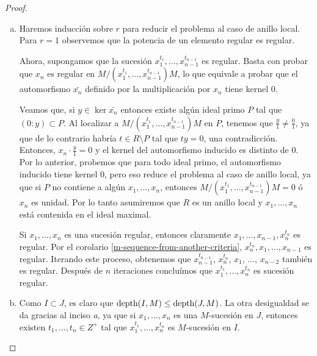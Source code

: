 \begin{proof}
\begin{enumerate}[a.]
\item Haremos inducción sobre $r$ para reducir el problema al caso de anillo local. Para $r = 1$ observemos que la potencia de un elemento regular es regular.

Ahora, supongamos que la sucesión $x_1^{t_1},\dots,x_{n-1}^{t_{n-1}}$ es regular. Basta con probar que $x_n$ es regular en $M/(x_1^{t_1},\dots,x_{n-1}^{t_{n-1}})M$, lo que equivale a probar que el automorfismo $\bar{x_n}$ definido por la multiplicación por $x_n$ tiene kernel 0. 

Veamos que, si $y \in \ker \bar{x_n}$ entonces existe algún ideal primo $P$ tal que $(0:y) \subset P$. Al localizar a $M/(x_1^{t_1},\dots,x_{n-1}^{t_{n-1}})M$ en $P$, tenemos que $\frac{y}{1} \neq \frac{0}{1}$, ya que de lo contrario habría $t \in R\setminus P$ tal que $ty = 0$, una contradicción. Entonces, $x_n\cdot\frac{y}{1} = 0$ y el kernel del automorfismo inducido es distinto de 0. Por lo anterior, probemos que para todo ideal primo, el automorfismo inducido tiene kernel 0, pero eso reduce el problema al caso de anillo local, ya que si $P$ no contiene a algún $x_1,\dots,x_n$, entonces $M/(x_1^{t_1},\dots,x_{n-1}^{t_{n-1}})M = 0$ ó $x_n$ es unidad. Por lo tanto asumiremos que $R$ es un anillo local y $x_1,\dots,x_n$ está contenida en el ideal maximal.

Si $x_1,\dots,x_n$ es una sucesión regular, entonces claramente $x_1,\dots,x_{n-1},x_n^{t_n}$ es regular. Por el corolario \ref{m-sequence-from-another-criteria}, $x_n^{t_n},x_1,\dots,x_{n-1}$ es regular. Iterando este proceso, obtenemos que $x_{n-1}^{t_{n-1}}$, $x_n^{t_n}$, $x_1$, $\dots$, $x_{n-2}$ también es regular. Después de $n$ iteraciones concluímos que $x_1^{t_1},\dots,x_n^{t_n}$ es sucesión regular.

\item Como $I \subset J$, es claro que $\textrm{depth}(I,M) \leq \textrm{depth}(J,M)$. La otra desigualdad se da gracias al inciso \emph{a}, ya que si $x_1, \dots, x_n$ es una $M$-sucesión en $J$, entonces existen $t_1,\dots,t_n \in Z^+$ tal que $x_1^{t_1},\dots,x_n^{t_n}$ es $M$-sucesión en $I$.

\end{enumerate}
\end{proof}
